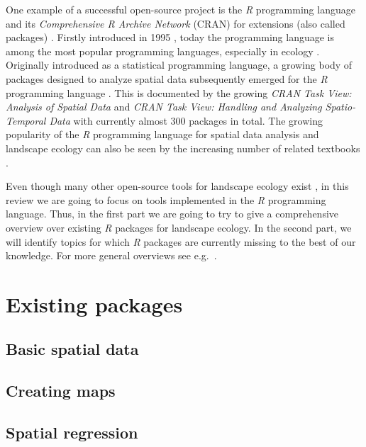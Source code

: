 \documentclass[smallextended]{svjour3}       %
\begin{document}
One example of a successful open-source project is the \emph{R}
programming language and its \emph{Comprehensive R Archive Network}
(CRAN) for extensions (also called packages) \cite{RCoreTeam2019}.
Firstly introduced in 1995 \cite{Smith2016}, today the programming
language is among the most popular programming languages, especially in
ecology \cite{Lai2019}. Originally introduced as a statistical
programming language, a growing body of packages designed to analyze
spatial data subsequently emerged for the \emph{R} programming language
\cite{Bivand2006}. This is documented by the growing \emph{CRAN Task
View: Analysis of Spatial Data} \cite{Bivand2019a} and \emph{CRAN Task
View: Handling and Analyzing Spatio-Temporal Data} \cite{Pebesma2020}
with currently almost 300 packages in total. The growing popularity of
the \emph{R} programming language for spatial data analysis and
landscape ecology can also be seen by the increasing number of related
textbooks \cite{Fletcher2019,Lovelace2019,Pebesma2019a}.

Even though many other open-source tools for landscape ecology exist
\cite{QGISDevelopmentTeam2016,GRASSDevelopmentTeam2017,Porta2017}, in
this review we are going to focus on tools implemented in the \emph{R}
programming language. Thus, in the first part we are going to try to
give a comprehensive overview over existing \emph{R} packages for
landscape ecology. In the second part, we will identify topics for which
\emph{R} packages are currently missing to the best of our knowledge.
For more general overviews see
e.g.~\cite{Jolma2008,Steiniger2009,Steiniger2009a,Istvan2012}.

\hypertarget{sec:existing_packages}{%
\section{Existing packages}\label{sec:existing_packages}}

\hypertarget{basic-spatial-data}{%
\subsection{Basic spatial data}\label{basic-spatial-data}}

\hypertarget{creating-maps}{%
\subsection{Creating maps}\label{creating-maps}}

\hypertarget{spatial-regression}{%
\subsection{Spatial regression}\label{spatial-regression}}
\end{document}
